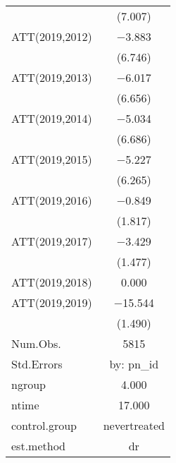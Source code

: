 \begin{table}
\begin{tabular}[t]{lc}
 & (\num{7.007})\\
ATT(2019,2012) & \num{-3.883}\\
 & (\num{6.746})\\
ATT(2019,2013) & \num{-6.017}\\
 & (\num{6.656})\\
ATT(2019,2014) & \num{-5.034}\\
 & (\num{6.686})\\
ATT(2019,2015) & \num{-5.227}\\
 & (\num{6.265})\\
ATT(2019,2016) & \num{-0.849}\\
 & (\num{1.817})\\
ATT(2019,2017) & \num{-3.429}\\
 & (\num{1.477})\\
ATT(2019,2018) & \num{0.000}\\
ATT(2019,2019) & \num{-15.544}\\
 & (\num{1.490})\\
\midrule
Num.Obs. & \num{5815}\\
Std.Errors & by: pn\_id\\
ngroup & \num{4.000}\\
ntime & \num{17.000}\\
control.group & nevertreated\\
est.method & dr\\
\bottomrule
\end{tabular}
\end{table}
